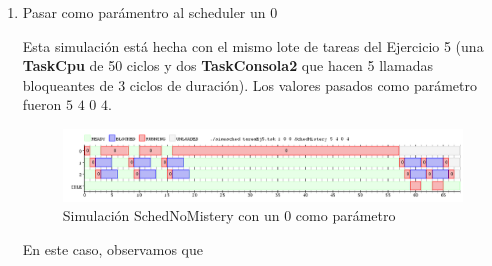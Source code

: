 \documentclass[11pt]{article}
\begin{document}
\begin{enumerate}
\item Pasar como parámentro al scheduler un $0$

Esta simulación está hecha con el mismo lote de tareas del Ejercicio 5 (una \textbf{TaskCpu} de 50 ciclos y dos \textbf{TaskConsola2} que hacen 5 llamadas bloqueantes de 3 ciclos de duración). 
Los valores pasados como parámetro fueron $5$ $4$ $0$ $4$.

      \begin{figure}[H]
        \includegraphics[scale=0.5]{Ej7Ej1bis}
        \caption{Simulación SchedNoMistery con un 0 como parámetro} 
      \end{figure}

En este caso, observamos que 

\end{enumerate}
\end{document}
